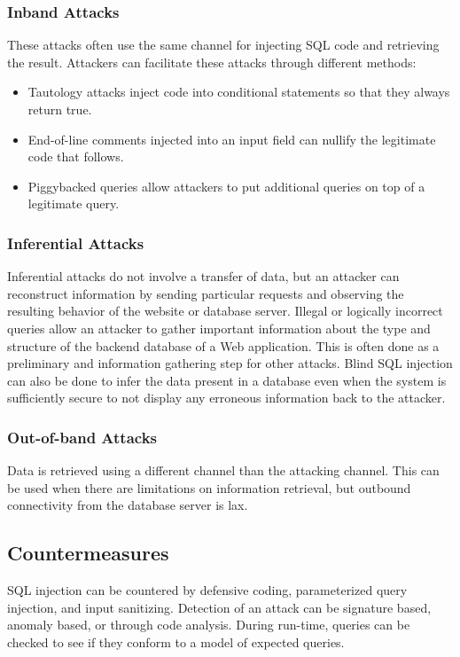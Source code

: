 \documentclass{math}
\begin{document}
\subsubsection*{Inband Attacks}
These attacks often use the same channel for injecting SQL code and retrieving
the result. Attackers can facilitate these attacks through different methods:
\begin{itemize}
  \item Tautology attacks inject code into conditional statements so that they
  always return true.
  \item End-of-line comments injected into an input field can nullify the
  legitimate code that follows.
  \item Piggybacked queries allow attackers to put additional queries on top of
  a legitimate query.
\end{itemize}

\subsubsection*{Inferential Attacks}
Inferential attacks do not involve a transfer of data, but an attacker can
reconstruct information by sending particular requests and observing the
resulting behavior of the website or database server. Illegal or logically
incorrect queries allow an attacker to gather important information about the
type and structure of the backend database of a Web application. This is
often done as a preliminary and information gathering step for other attacks.
Blind SQL injection can also be done to infer the data present in a database
even when the system is sufficiently secure to not display any erroneous
information back to the attacker.

\subsubsection*{Out-of-band Attacks}
Data is retrieved using a different channel than the attacking channel. This
can be used when there are limitations on information retrieval, but outbound
connectivity from the database server is lax.

\subsection*{Countermeasures}
SQL injection can be countered by defensive coding, parameterized query
injection, and input sanitizing. Detection of an attack can be signature based,
anomaly based, or through code analysis. During run-time, queries can be checked
to see if they conform to a model of expected queries.
\end{document}
